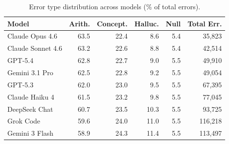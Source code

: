 \begin{table}[t]
\centering
\small
\caption{Error type distribution across models (\% of total errors).}
\label{tab:error_types}
\begin{tabular}{lrrrrr}
\toprule
Model & Arith. & Concept. & Halluc. & Null & Total Err. \\
\midrule
Claude Opus 4.6 & 63.5 & 22.4 & 8.6 & 5.4 & 35,823 \\
Claude Sonnet 4.6 & 63.2 & 22.6 & 8.8 & 5.4 & 42,514 \\
GPT-5.4 & 62.8 & 22.7 & 9.0 & 5.5 & 49,910 \\
Gemini 3.1 Pro & 62.5 & 22.8 & 9.2 & 5.5 & 49,054 \\
GPT-5.3 & 62.0 & 23.0 & 9.5 & 5.5 & 67,395 \\
Claude Haiku 4 & 61.5 & 23.2 & 9.8 & 5.5 & 77,045 \\
DeepSeek Chat & 60.7 & 23.5 & 10.3 & 5.5 & 93,725 \\
Grok Code & 59.6 & 24.0 & 11.0 & 5.5 & 116,218 \\
Gemini 3 Flash & 58.9 & 24.3 & 11.4 & 5.5 & 113,497 \\
\bottomrule
\end{tabular}
\end{table}